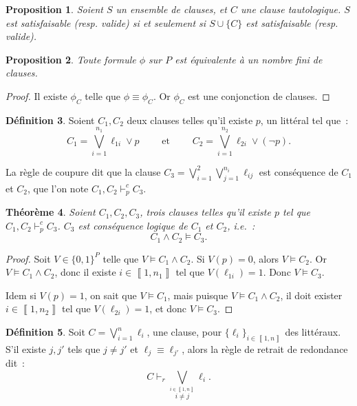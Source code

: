 \documentclass{article}
\newtheorem{thm}{Théorème}[section]
\newtheorem{prp}[thm]{Proposition}
\theoremstyle{definition}
\newtheorem{déf}[thm]{Définition}
\theoremstyle{remark}
\newcommand{\intint}[2]{\left\llbracket#1, #2\right\rrbracket}
\begin{document}
	\begin{prp} Soient $S$ un ensemble de clauses, et $C$ une clause tautologique. $S$ est satisfaisable (resp. valide) si et seulement si $S \cup \{C\}$
	est satisfaisable (resp. valide).
	\end{prp}

	\begin{prp} Toute formule $\phi$ sur $P$ est équivalente à un nombre fini de clauses.
	\end{prp}

	\begin{proof} Il existe $\phi_C$ telle que $\phi \equiv \phi_C$. Or $\phi_C$ est une conjonction de clauses.
	\end{proof}

	\begin{déf} Soient $C_1, C_2$ deux clauses telles qu'il existe $p$, un littéral tel que~:
	\[C_1 = \bigvee_{i=1}^{n_1}\ell_{1i} \lor p \qquad \text{ et } \qquad C_2 = \bigvee_{i=1}^{n_2} \ell_{2i} \lor (\lnot p).\]

	La règle de coupure dit que la clause $C_3 = \bigvee_{i=1}^2\bigvee_{j=1}^{n_i}\ell_{ij}$ est conséquence de $C_1$ et $C_2$, que l'on note $C_1,C_2 \vdash_p^c C_3$.
	\end{déf}

	\begin{thm} Soient $C_1, C_2, C_3$, trois clauses telles qu'il existe $p$ tel que $C_1,C_2 \vdash_p^c C_3$. $C_3$ est conséquence logique de $C_1$ et $C_2$, i.e.~:
	\[C_1 \land C_2 \models C_3.\]
	\end{thm}

	\begin{proof} Soit $V \in \{0, 1\}^P$ telle que $V \models C_1 \land C_2$. Si $V(p) = 0$, alors $V \models C_2$. Or $V \models C_1 \land C_2$, donc il existe
	$i \in \intint 1{n_1}$ tel que $V(\ell_{1i}) = 1$. Donc $V \models C_3$.

	Idem si $V(p) = 1$, on sait que $V \models C_1$, mais puisque $V \models C_1 \land C_2$, il doit exister $i \in \intint 1{n_2}$ tel que $V(\ell_{2i}) = 1$,
	et donc $V \models C_3$.
	\end{proof}

	\begin{déf} Soit $C = \bigvee_{i=1}^n\ell_i$, une clause, pour $\{\ell_i\}_{i \in \intint 1n}$ des littéraux. S'il existe $j, j'$ tels que
	$j \neq j'$ et $\ell_j \equiv \ell_{j'}$, alors la règle de retrait de redondance dit~:
	\[C \vdash_r \bigvee_{\stackrel {i \in \intint 1n}{i \neq j}}\ell_i.\]
	\end{déf}
\end{document}
